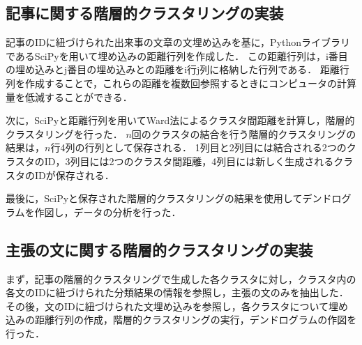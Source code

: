 \documentclass[12pt,a4j,dvipdfmx]{jreport}
\begin{document}

\newpage


\subsection{記事に関する階層的クラスタリングの実装}
記事のIDに紐づけられた出来事の文章の文埋め込みを基に，PythonライブラリであるSciPyを用いて埋め込みの距離行列を作成した．
この距離行列は，i番目の埋め込みとj番目の埋め込みとの距離をi行j列に格納した行列である．
距離行列を作成することで，これらの距離を複数回参照するときにコンピュータの計算量を低減することができる．

次に，SciPyと距離行列を用いてWard法によるクラスタ間距離を計算し，階層的クラスタリングを行った．
$n$回のクラスタの結合を行う階層的クラスタリングの結果は，$n$行4列の行列として保存される．
1列目と2列目には結合される2つのクラスタのID，3列目には2つのクラスタ間距離，4列目には新しく生成されるクラスタのIDが保存される．

最後に，SciPyと保存された階層的クラスタリングの結果を使用してデンドログラムを作図し，データの分析を行った．


\subsection{主張の文に関する階層的クラスタリングの実装}
まず，記事の階層的クラスタリングで生成した各クラスタに対し，クラスタ内の各文のIDに紐づけられた分類結果の情報を参照し，主張の文のみを抽出した．
その後，文のIDに紐づけられた文埋め込みを参照し，各クラスタについて埋め込みの距離行列の作成，階層的クラスタリングの実行，デンドログラムの作図を行った．


\end{document}
